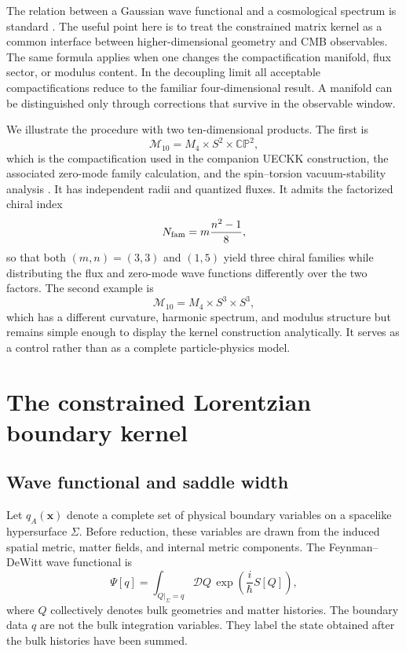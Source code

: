 \documentclass[aps,prd,twocolumn,superscriptaddress,nofootinbib,longbibliography]{revtex4-2}
\newcommand{\cM}{\mathcal M}
\newcommand{\CP}{\mathbb{CP}}
\begin{document}
The relation between a Gaussian wave functional and a cosmological spectrum is standard \cite{HalliwellHawking1985,PolarskiStarobinsky1996,Maldacena2003}. The useful point here is to treat the constrained matrix kernel as a common interface between higher-dimensional geometry and CMB observables. The same formula applies when one changes the compactification manifold, flux sector, or modulus content. In the decoupling limit all acceptable compactifications reduce to the familiar four-dimensional result. A manifold can be distinguished only through corrections that survive in the observable window.

We illustrate the procedure with two ten-dimensional products. The first is
\begin{equation}
\cM_{10}=M_4\times S^2\times\CP^2,
\end{equation}
which is the compactification used in the companion UECKK construction, the associated zero-mode family calculation, and the spin--torsion vacuum-stability analysis \cite{ShayaUECKK2026,ShayaZeroModes2026,ShayaVacuum2026}. It has independent radii and quantized fluxes. It admits the factorized chiral index
\begin{equation}
N_{\rm fam}=m\frac{n^2-1}{8},
\end{equation}
so that both $(m,n)=(3,3)$ and $(1,5)$ yield three chiral families while distributing the flux and zero-mode wave functions differently over the two factors. The second example is
\begin{equation}
\cM_{10}=M_4\times S^3\times S^3,
\end{equation}
which has a different curvature, harmonic spectrum, and modulus structure but remains simple enough to display the kernel construction analytically. It serves as a control rather than as a complete particle-physics model.

\section{The constrained Lorentzian boundary kernel}
\label{sec:kernel}

\subsection{Wave functional and saddle width}
Let $q_A(\bm x)$ denote a complete set of physical boundary variables on a spacelike hypersurface $\Sigma$. Before reduction, these variables are drawn from the induced spatial metric, matter fields, and internal metric components. The Feynman--DeWitt wave functional is
\begin{equation}
\Psi[q]=\int_{Q|_\Sigma=q}\mathcal DQ\,
\exp\left(\frac{i}{\hbar}S[Q]\right),
\end{equation}
where $Q$ collectively denotes bulk geometries and matter histories. The boundary data $q$ are not the bulk integration variables. They label the state obtained after the bulk histories have been summed.
\end{document}
